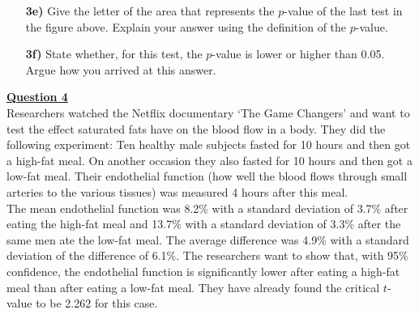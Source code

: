 \begin{itemize}

\item[\textbf{3e)}] Give the letter of the area that represents the $p$-value of the last test in the figure above. Explain your answer using the definition of the $p$-value.

\item[\textbf{3f)}] State whether, for this test, the $p$-value is lower or higher than 0.05. Argue how you arrived at this answer.
    
\end{itemize}

\clearpage %

\underline{\textbf{Question 4}} \\

Researchers watched the Netflix documentary ‘The Game Changers’ and want to test the effect saturated fats have on the blood flow in a body. They did the following experiment: Ten healthy male subjects fasted for 10 hours and then got a high-fat meal. On another occasion they also fasted for 10 hours and then got a low-fat meal. Their endothelial function (how well the blood flows through small arteries to the various tissues) was measured 4 hours after this meal. \\

The mean endothelial function was 8.2\% with a standard deviation of 3.7\% after eating the high-fat meal and 13.7\% with a standard deviation of 3.3\% after the same men ate the low-fat meal. The average difference was 4.9\% with a standard deviation of the difference of 6.1\%. The researchers want to show that, with 95\% confidence, the endothelial function is significantly lower after eating a high-fat meal than after eating a low-fat meal. They have already found the critical $t$-value to be 2.262 for this case.


